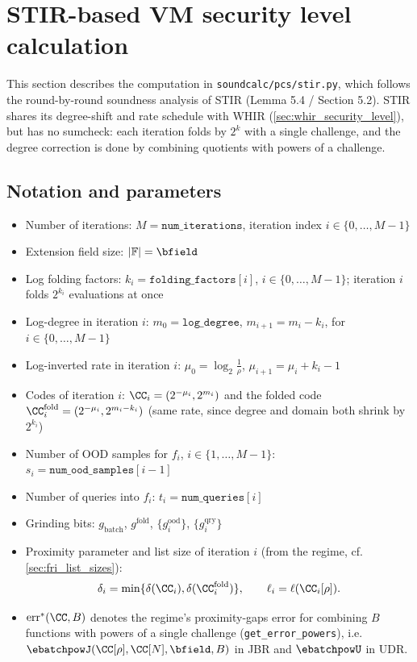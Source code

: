\newpage

\section{STIR-based VM security level calculation}\label{sec:stir_security_level}

This section describes the computation in \verb|soundcalc/pcs/stir.py|, which follows the round-by-round soundness analysis of STIR \cite{ACFY24} (Lemma 5.4 / Section 5.2). STIR shares its degree-shift and rate schedule with WHIR (\cref{sec:whir_security_level}), but has no sumcheck: each iteration folds by $2^k$ with a single challenge, and the degree correction is done by combining quotients with powers of a challenge.

\subsection{Notation and parameters}\label{sec:stir_notation}

\begin{itemize}
  \item Number of iterations: \(M = \texttt{num\_iterations}\), iteration index \(i \in \{0,\dots,M-1\}\)
  \item Extension field size: \(|\mathbb{F}| = \bfield\)
  \item Log folding factors: \(k_i = \texttt{folding\_factors}[i]\), $i\in\{0,\ldots,M-1\}$; iteration $i$ folds $2^{k_i}$ evaluations at once
  \item Log-degree in iteration \(i\): \(m_0 = \texttt{log\_degree}\), \(m_{i+1} = m_i-k_i\), for $i\in\{0,\ldots,M-1\}$
  \item Log-inverted rate in iteration \(i\): \(\mu_0 = \log_2 \frac{1}{\rho}\), \(\mu_{i+1} = \mu_i + k_i - 1\)
  \item Codes of iteration $i$: $\CC_i = (2^{-\mu_i}, 2^{m_i})$ and the folded code $\CC_i^{\mathrm{fold}} = (2^{-\mu_i}, 2^{m_i-k_i})$ (same rate, since degree and domain both shrink by $2^{k_i}$)
  \item Number of OOD samples for $f_i$, $i \in \{1,\ldots,M-1\}$: \(s_i = \texttt{num\_ood\_samples}[i-1]\)
  \item Number of queries into $f_i$: \(t_i = \texttt{num\_queries}[i]\)
  \item Grinding bits: $g_{\mathrm{batch}}$, $g^{\mathrm{fold}}$, $\{g^{\mathrm{ood}}_i\}$, $\{g^{\mathrm{qry}}_i\}$
  \item Proximity parameter and list size of iteration $i$ (from the regime, cf. \cref{sec:fri_list_sizes}):
  $$
  \delta_i = \min\{\delta(\CC_i), \delta(\CC_i^{\mathrm{fold}})\}, \qquad \ell_i = \ell(\CC_i[\rho]).
  $$
  \item $\operatorname{err}^*(\CC, B)$ denotes the regime's proximity-gaps error for combining $B$ functions with powers of a single challenge (\verb|get_error_powers|), i.e.\ $\ebatchpowJ(\CC[\rho],\CC[N],\bfield,B)$ in JBR and $\ebatchpowU$ in UDR.
\end{itemize}

